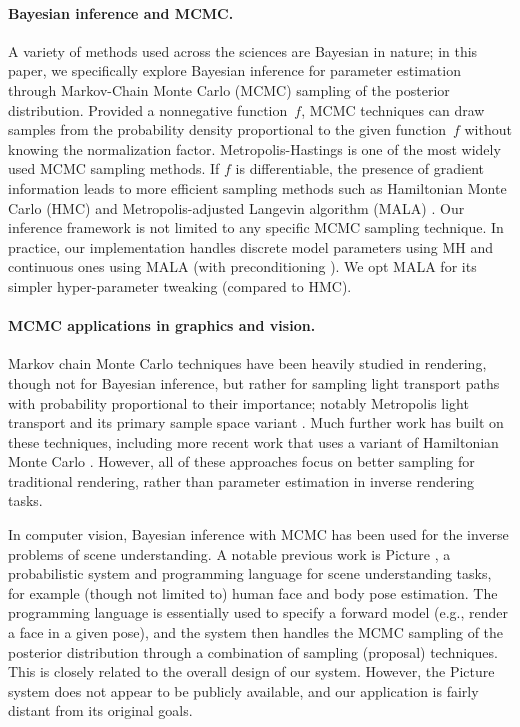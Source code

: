 \paragraph{Bayesian inference and MCMC.} A variety of methods used across the sciences are Bayesian in nature; in this paper, we specifically explore Bayesian inference for parameter estimation through Markov-Chain Monte Carlo (MCMC) sampling of the posterior distribution. Provided a nonnegative function~$f$, MCMC techniques can draw samples from the probability density proportional to the given function~$f$ without knowing the normalization factor. Metropolis-Hastings \cite{hastings1970monte} is one of the most widely used MCMC sampling methods. If $f$ is differentiable, the presence of gradient information leads to more efficient sampling methods such as Hamiltonian Monte Carlo (HMC) \cite{neal2011mcmc,betancourt2017conceptual} and Metropolis-adjusted Langevin algorithm (MALA) \cite{roberts1996exponential}.
Our inference framework is not limited to any specific MCMC sampling technique.
In practice, our implementation handles discrete model parameters using MH and continuous ones using MALA (with preconditioning \cite{chen2016bridging}). We opt MALA for its simpler hyper-parameter tweaking (compared to HMC).

\paragraph{MCMC applications in graphics and vision.} Markov chain Monte Carlo techniques have been heavily studied in rendering, though not for Bayesian inference, but rather for sampling light transport paths with probability proportional to their importance; notably Metropolis light transport \cite{veach1997metropolis} and its primary sample space variant \cite{kelemen2002simple}. Much further work has built on these techniques, including more recent work that uses a variant of Hamiltonian Monte Carlo \cite{li2015anisotropic}. However, all of these approaches focus on better sampling for traditional rendering, rather than parameter estimation in inverse rendering tasks.

In computer vision, Bayesian inference with MCMC has been used for the inverse problems of scene understanding. A notable previous work is Picture \cite{kulkarni2015picture}, a probabilistic system and programming language for scene understanding tasks, for example (though not limited to) human face and body pose estimation. The programming language is essentially used to specify a forward model (e.g., render a face in a given pose), and the system then handles the MCMC sampling of the posterior distribution through a combination of sampling (proposal) techniques. This is closely related to the overall design of our system. However, the Picture system does not appear to be publicly available, and our application is fairly distant from its original goals.

